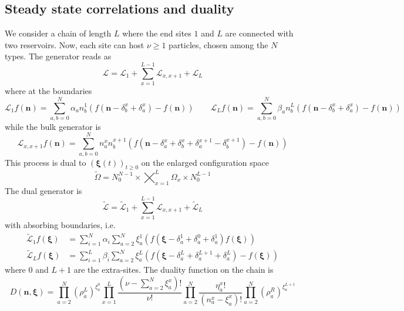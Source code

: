 \documentclass[11pt]{article}
\numberwithin{equation}{section}
\numberwithin{equation}{subsection}
\begin{document}
\subsection{Steady state correlations and duality}
We consider a chain of length $L$ where the end sites $1$ and $L$ are connected with two reservoirs. Now, each site can host $\nu\geq 1$ particles, chosen among the $N$ types. The generator reads as
\begin{equation}
	\mathcal{L}=\mathcal{L}_{1}+\sum_{x=1}^{L-1}\mathcal{L}_{x,x+1}+\mathcal{L}_{L}
\end{equation} 
where at the boundaries 
\begin{equation}
	\mathcal{L}_{1}f(\bm{n})=\sum_{a,b=0}^{N}\alpha_{a}n_{b}^{1}\left(f(\bm{n}-\delta_{b}^{x}+\delta_{a}^{x})-f(\bm{n})\right)\qquad \mathcal{L}_{L}f(\bm{n})=\sum_{a,b=0}^{N}\beta_{a}n_{b}^{L}\left(f(\bm{n}-\delta_{b}^{x}+\delta_{a}^{x})-f(\bm{n})\right)
\end{equation}
while the bulk generator is 
\begin{equation}
 \mathcal{L}_{x,x+1}f(\bm{n})=\sum_{a,b=0}^{N}n_{a}^{x}n_{b}^{x+1}\left(f(\bm{n}-\delta_{a}^{x}+\delta_{b}^{x}+\delta_{a}^{x+1}-\delta_{b}^{x+1})-f(\bm{n})\right)
\end{equation}
This process is dual to $(\bm{\xi}(t))_{t\geq0} $ on the enlarged configuration space
 \begin{equation}	
	\widetilde{\Omega}=N_{0}^{N-1}\times\bigtimes_{x=1}^{L} \Omega_{x}\times N_{0}^{L-1}
\end{equation}
The dual generator is 
\begin{equation}
	\widetilde{\mathcal{L}}=\widetilde{\mathcal{L}}_{1}+\sum_{x=1}^{L-1}\mathcal{L}_{x,x+1}+\widetilde{\mathcal{L}}_{L}
\end{equation} 
with absorbing boundaries, i.e. 
\begin{equation}
	\begin{split}
		\widetilde{\mathcal{L}}_{1}f(\bm{\xi})&=\sum_{i=1}^{N}\alpha_{i}\sum_{a=2}^{N}\xi_{a}^{1}\left(f(\bm{\xi}-\delta_{a}^{1}+\delta_{a}^{0}+\delta_{a}^{1})f(\bm{\xi})\right)\\\widetilde{\mathcal{L}}_{L}f(\bm{\xi})&=\sum_{i=1}^{L}\beta_{i}\sum_{a=2}^{N}\xi_{a}^{L}\left(f(\bm{\xi}-\delta_{a}^{L}+\delta_{a}^{L+1}+\delta_{a}^{L})-f(\bm{\xi})\right)
	\end{split}
\end{equation}
where $0$ and $L+1$ are the extra-sites. The duality function on the chain is
\begin{equation}\label{dualityFunctionChain}
	D(\bm{n},\bm{\xi})=\prod_{a=2}^{N}\left(\rho_{a}^{L}\right)^{\xi_{a}^{0}}\prod_{x=1}^{L}\frac{(\nu-\sum_{a=2}^{N}\xi_{a}^{x})!}{\nu!}\prod_{a=2}^{N}\frac{\eta_{a}^{x}!}{(n_{a}^{x}-\xi_{a}^{x})!}\prod_{a=2}^{N}\left(\rho_{a}^{R}\right)^{\xi_{a}^{L+1}}
\end{equation}
\end{document}
